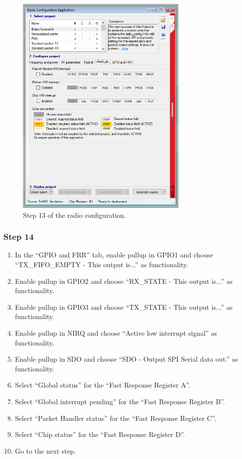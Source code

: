 \begin{figure}[!h]
	\begin{center}
		\includegraphics[width=0.75\textwidth]{figures/wds-tutorial/wds-tutorial-13.png}
		\caption{Step 13 of the radio configuration.}
		\label{fig:wds-tutorial-step-13}
	\end{center}
\end{figure}

\subsubsection{Step 14}

\begin{enumerate}
    \item In the ``GPIO and FRR'' tab, enable pullup in GPIO1 and choose ``TX\_FIFO\_EMPTY - This output is...'' as functionality.
    \item Enable pullup in GPIO2 and choose ``RX\_STATE - This output is...'' as functionality.
    \item Enable pullup in GPIO3 and choose ``TX\_STATE - This output is...'' as functionality.
    \item Enable pullup in NIRQ and choose ``Active low interrupt signal'' as functionality.
    \item Enable pullup in SDO and choose ``SDO - Output SPI Serial data out.'' as functionality.
    \item Select ``Global status'' for the ``Fast Response Register A''.
    \item Select ``Global interrupt pending'' for the ``Fast Response Register B''.
    \item Select ``Packet Handler status'' for the ``Fast Response Register C''.
    \item Select ``Chip status'' for the ``Fast Response Register D''.
    \item Go to the next step.
\end{enumerate}


